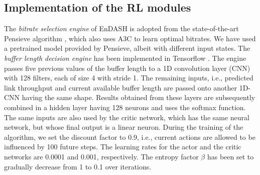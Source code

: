 \subsection{Implementation of the \ac{RL} modules}
The \textit{bitrate selection engine} of EnDASH is adopted from the state-of-the-art Pensieve algorithm \cite{mao2017neural}, which also uses A3C to learn optimal bitrates. We have used a pretrained model provided by Pensieve, albeit with different input states.  The \textit{buffer length decision engine} has been implemented in Tensorflow \cite{Abadi2016}. The engine passes five previous values of the buffer length to a 1D convolution layer (CNN) with 128 filters, each of size 4 with stride 1. The remaining inputs, i.e., predicted link throughput and current available buffer length are passed onto another 1D-CNN having the same shape. Results obtained from these layers are subsequently combined in a hidden layer having 128 neurons and uses the softmax function. The same inputs are also used by the critic network, which has the same neural network, but whose final output is a linear neuron. During the training of the algorithm, we set the discount factor to 0.9, i.e., current actions are allowed to be influenced by 100 future steps. The learning rates for the actor and the critic networks are 0.0001 and 0.001, respectively. The entropy factor $\beta$ has been set to gradually decrease from 1 to 0.1 over iterations.

